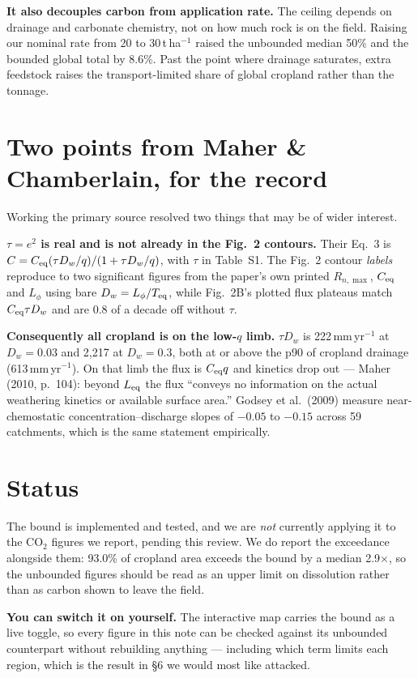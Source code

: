 \documentclass[11pt,a4paper]{article}
\newcommand{\cotwo}{CO$_2$}
\begin{document}
\textbf{It also decouples carbon from application rate.} The ceiling depends on
drainage and carbonate chemistry, not on how much rock is on the field. Raising our
nominal rate from 20 to 30\,t\,ha$^{-1}$ raised the
unbounded median 50\% and the bounded global total by 8.6\%. Past the point where
drainage saturates, extra feedstock raises the transport-limited share of global
cropland rather than the tonnage.

\section{Two points from Maher \& Chamberlain, for the record}

Working the primary source resolved two things that may be of wider interest.

\textbf{$\tau = e^2$ is real and is not already in the Fig.~2 contours.} Their Eq.~3
is $C = C_{\rm eq}(\tau D_w/q)/(1 + \tau D_w/q)$, with $\tau$ in Table~S1. The Fig.~2
contour \emph{labels} reproduce to two significant figures from the paper's own
printed $R_{n,\max}$, $C_{\rm eq}$ and $L_\phi$ using bare $D_w = L_\phi/T_{\rm eq}$,
while Fig.~2B's plotted flux plateaus match $C_{\rm eq}\tau D_w$ and are 0.8 of a
decade off without $\tau$.

\textbf{Consequently all cropland is on the low-$q$ limb.} $\tau D_w$ is
222\,mm\,yr$^{-1}$ at $D_w = 0.03$ and
2,217 at $D_w = 0.3$, both at or above the p90 of cropland drainage
(613\,mm\,yr$^{-1}$). On that limb the flux is $C_{\rm eq}q$ and kinetics drop
out --- Maher (2010, p.~104): beyond $L_{\rm eq}$ the flux ``conveys no information
on the actual weathering kinetics or available surface area.'' Godsey et al.\ (2009)
measure near-chemostatic concentration--discharge slopes of $-0.05$ to $-0.15$
across 59 catchments, which is the same statement empirically.

\section{Status}

The bound is implemented and tested, and we are \emph{not} currently applying it to
the \cotwo{} figures we report, pending this review. We do report the exceedance
alongside them: 93.0\% of cropland area exceeds the bound by a median
2.9$\times$, so the unbounded figures should be read as an upper limit on
dissolution rather than as carbon shown to leave the field.

\textbf{You can switch it on yourself.} The interactive map carries the bound as a
live toggle, so every figure in this note can be checked against its unbounded
counterpart without rebuilding anything --- including which term limits each region,
which is the result in \S6 we would most like attacked.
\end{document}
